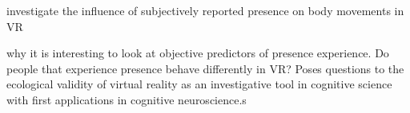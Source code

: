 investigate the influence of subjectively reported presence on body movements in VR

why it is interesting to look at objective predictors of presence experience. Do people that experience presence behave differently in VR? Poses questions to the ecological validity of virtual reality as an investigative tool in cognitive science with first applications in cognitive neuroscience.s

